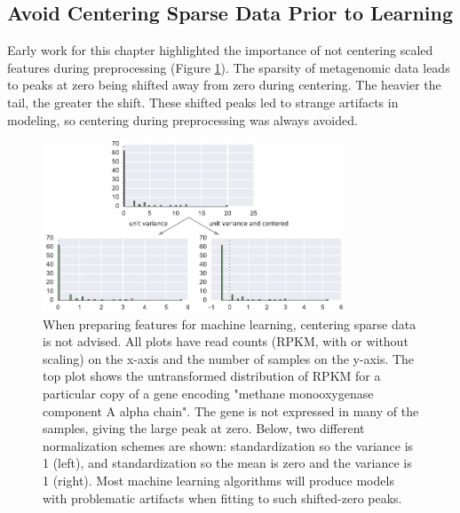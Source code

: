 \subsection{Avoid Centering Sparse Data Prior to Learning}
\label{sect:centering_sparse}
Early work for this chapter highlighted the importance of not centering scaled features during preprocessing (Figure \ref{fig:standard_scaler}).
The sparsity of metagenomic data leads to peaks at zero being shifted away from zero during centering. %
The heavier the tail, the greater the shift. %
These shifted peaks led to strange artifacts in modeling, so centering during preprocessing was always avoided.

\begin{figure}[H]
\centering
    \includegraphics[width=0.8\textwidth]{./tex/chapter3/figures/170324_standard_scalar.pdf}
    \begin{singlespace}
    \caption[Feature scaling: centering sparse features is not advised]{
        When preparing features for machine learning, centering sparse data is not advised.
        All plots have read counts (RPKM, with or without scaling) on the x-axis and the number of samples on the y-axis.
        The top plot shows the untransformed distribution of RPKM for a particular copy of a gene encoding
            "methane monooxygenase component A alpha chain".
        The gene is not expressed in many of the samples, giving the large peak at zero.
        Below, two different normalization schemes are shown:
            standardization so the variance is 1 (left), and
            standardization so the mean is zero and the variance is 1 (right).
        Most machine learning algorithms will produce models with problematic artifacts when fitting to such shifted-zero peaks.
        }
    \label{fig:standard_scaler}
    \end{singlespace}
\end{figure}

